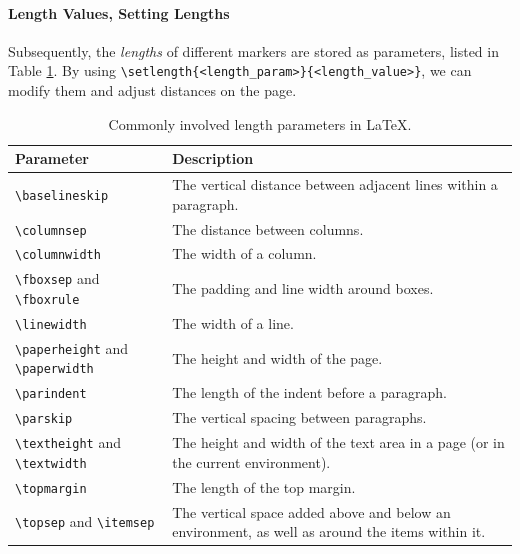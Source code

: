 \paragraph{Length Values, Setting Lengths}
Subsequently, the \textit{lengths} of different markers are stored as parameters, listed in Table \ref{tab:lengthpmt}. By using \texttt{\textbackslash setlength\{<length\_\allowbreak param>\}\{<length\_value>\}}, we can modify them and adjust distances on the page.

\begin{table}[ht!]
\begin{tabularx}{\textwidth}{|p{}|X|}
\hline
Parameter & Description \\
\hline
\texttt{\textbackslash baselineskip} & The vertical distance between adjacent lines within a paragraph.  \\
\hline
\texttt{\textbackslash columnsep} & The distance between columns. \\
\hline
\texttt{\textbackslash columnwidth} & The width of a column. \\
\hline
\texttt{\textbackslash fboxsep} and \texttt{\textbackslash fboxrule} & The padding and line width around boxes. \\
\hline
\texttt{\textbackslash linewidth} & The width of a line. \\
\hline
\texttt{\textbackslash paperheight} and \texttt{\textbackslash paperwidth} & The height and width of the page. \\
\hline
\texttt{\textbackslash parindent} & The length of the indent before a paragraph. \\
\hline
\texttt{\textbackslash parskip} & The vertical spacing between paragraphs. \\
\hline
\texttt{\textbackslash textheight} and \texttt{\textbackslash textwidth} & The height and width of the text area in a page (or in the current environment). \\
\hline
\texttt{\textbackslash topmargin} & The length of the top margin. \\
\hline
\texttt{\textbackslash topsep} and \texttt{\textbackslash itemsep} & The vertical space added above and below an environment, as well as around the items within it. \\
\hline
\end{tabularx}
\caption{Commonly involved length parameters in \LaTeX{}.}
\label{tab:lengthpmt}
\end{table}
